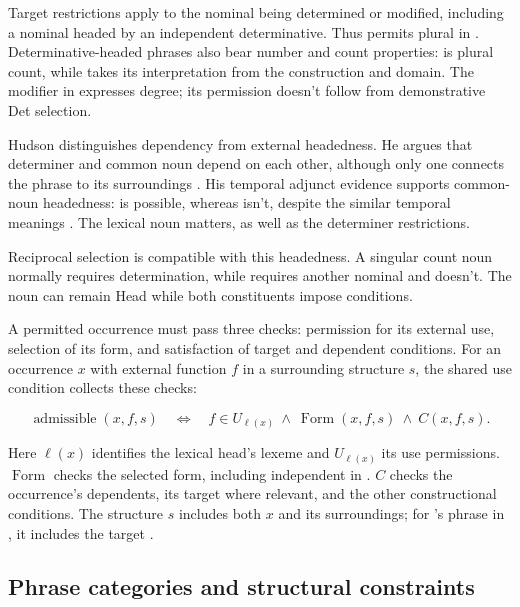 \documentclass[12pt]{article}
\begin{document}
Target restrictions apply to the nominal being determined or modified, including a nominal headed by an independent determinative. Thus  permits plural  in . Determinative-headed phrases also bear number and count properties:  is plural count, while  takes its interpretation from the construction and domain. The modifier  in  expresses degree; its permission doesn't follow from demonstrative Det selection.

Hudson distinguishes dependency from external headedness. He argues that determiner and common noun depend on each other, although only one connects the phrase to its surroundings \citep[7--8]{hudson2004determiners}. His temporal adjunct evidence supports common-noun headedness:  is possible, whereas  isn't, despite the similar temporal meanings \citep[10--12]{hudson2004determiners}. The lexical noun matters, as well as the determiner restrictions.

Reciprocal selection is compatible with this headedness. A singular count noun normally requires determination, while  requires another nominal and  doesn't. The noun can remain Head while both constituents impose conditions.

A permitted occurrence must pass three checks: permission for its external use, selection of its form, and satisfaction of target and dependent conditions. For an occurrence $x$ with external function $f$ in a surrounding structure $s$, the shared use condition collects these checks:

\[
\operatorname{admissible}(x,f,s)
\quad\Longleftrightarrow\quad
f\in U_{\ell(x)}\ \land\ \operatorname{Form}(x,f,s)\ \land\ C(x,f,s).
\]

Here $\ell(x)$ identifies the lexical head's lexeme and $U_{\ell(x)}$ its use permissions. $\operatorname{Form}$ checks the selected form, including independent  in . $C$ checks the occurrence's dependents, its target where relevant, and the other constructional conditions. The structure $s$ includes both $x$ and its surroundings; for 's phrase in , it includes the target .

\subsection{Phrase categories and structural constraints}\label{sec:det-uniform}
\end{document}
